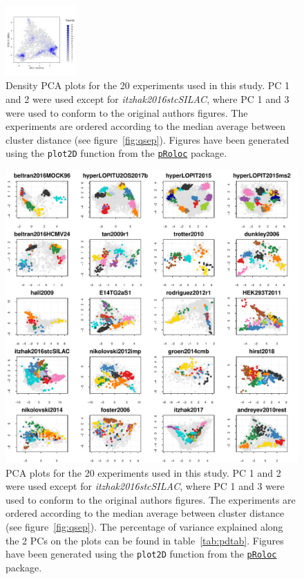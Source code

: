 \documentclass[12pt]{article}\usepackage[]{graphicx}\usepackage[]{color}
\makeatletter
\def\maxwidth{ %
  \ifdim\Gin@nat@width>\linewidth
    \linewidth
  \else
    \Gin@nat@width
  \fi
}
\newenvironment{knitrout}{}{} %
\newcommand{\Rpackage}[1]{\texttt{#1}}
\newcommand\Biocpkg[1]{%
  {\href{http://bioconductor.org/packages/#1}%
    {\Rpackage{#1}}}}
\makeatother
\begin{document}
\begin{figure}[p]
  \includegraphics[width = 0.24\textwidth]{./figure/fighexpca-20.pdf}
  \caption{Density PCA plots for the 20 experiments
    used in this study. PC 1 and 2 were used except for
    \textit{itzhak2016stcSILAC}, where PC 1 and 3 were used to conform
    to the original authors figures. The experiments are ordered
    according to the median average between cluster distance (see
    figure~\ref{fig:qsep}). Figures have been generated using the
    \texttt{plot2D} function from the \Biocpkg{pRoloc} package.}
  \label{fig:denspca}
\end{figure}


\begin{figure}[p]
  \centering
\begin{knitrout}
\color{fgcolor}
\includegraphics[width=\maxwidth]{figure/figpca-1} 

\end{knitrout}
\caption{PCA plots for the 20 experiments used in
  this study. PC 1 and 2 were used except for
  \textit{itzhak2016stcSILAC}, where PC 1 and 3 were used to conform to
  the original authors figures. The experiments are ordered according
  to the median average between cluster distance (see
  figure~\ref{fig:qsep}). The percentage of variance explained along
  the 2 PCs on the plots can be found in
  table~\ref{tab:pdtab}. Figures have been generated using the
  \texttt{plot2D} function from the \Biocpkg{pRoloc} package.}
  \label{fig:pca}
\end{figure}
\end{document}
